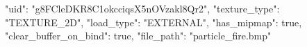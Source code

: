 {
    "uid": "g8FCleDKR8C1okcciqsX5nOVzakl8Qr2",
    "texture_type": "TEXTURE_2D",
    "load_type": "EXTERNAL",
    "has_mipmap": true,
    "clear_buffer_on_bind": true,
    "file_path": "particle_fire.bmp"
}